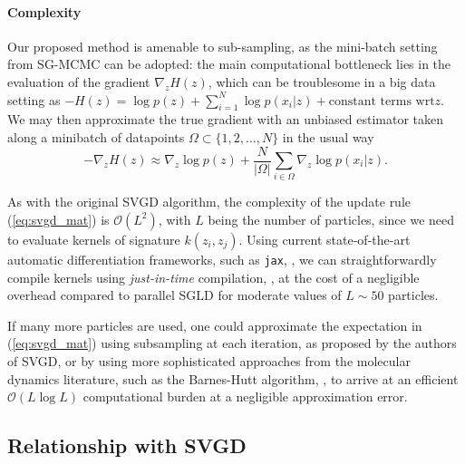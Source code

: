 \paragraph{Complexity}  Our proposed method is amenable to sub-sampling, as the mini-batch setting from SG-MCMC can be adopted: the main computational bottleneck lies in the evaluation of the gradient $\nabla_{{z}} H(z)$, which can be troublesome in a big data setting as $- H(z) = \log p(z) + \sum_{i=1}^N \log p({x}_i | {z}) + \mbox{constant terms wrt} z$.
We may then  approximate the true gradient with an unbiased estimator taken along a minibatch of datapoints $\Omega \subset \lbrace 1, 2, \ldots, N \rbrace$ in the usual way
$$
-\nabla_{{z}} H(z) \approx \nabla_{{z}} \log p({z}) + \frac{N}{| \Omega |} \sum_{i \in \Omega} \nabla_{{z}} \log p({x}_i | {z}).
$$




As with the original SVGD algorithm, the complexity of the update rule (\ref{eq:svgd_mat}) is $\mathcal{O}(L^2)$, with $L$ being the number of particles, since we need to evaluate kernels of signature $k(z_i, z_j)$. Using current state-of-the-art automatic differentiation frameworks, such as \texttt{jax}, \cite{jax2018github}, we can straightforwardly compile kernels using \emph{just-in-time} compilation, \cite{frostig2018compiling}, at the cost of a negligible overhead compared to parallel SGLD for moderate values of $L \sim 50$ particles.

If many more particles are  used, one could approximate the expectation in (\ref{eq:svgd_mat}) using subsampling at each iteration, as proposed by the authors of SVGD, or by using more sophisticated approaches from the molecular dynamics literature, such as the Barnes-Hutt algorithm, \cite{barnes1986hierarchical}, to arrive at an efficient $\mathcal{O}(L \log L)$ computational burden at a negligible approximation error. %


\subsection{Relationship with SVGD}\label{sec:relationship}

